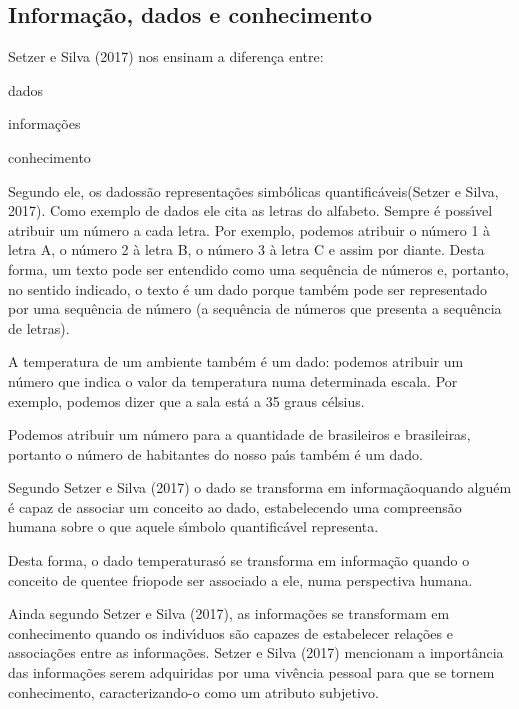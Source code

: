 \documentclass[
12pt,		%
openright,	%
twoside,  %
a4paper,			%
chapter=TITLE,		%
english,			%
french,				%
spanish,			%
brazil				%
]{USPSC-classe/USPSC}
\begin{document}
\subsection[Informa\c{c}\~ao, dados e conhecimento]{Informa\c{c}\~ao, dados e conhecimento}\label{Informa\c{c}\~ao, dados e conhecimento}
 Setzer e Silva (2017)  nos ensinam a diferen\c{c}a entre:



\begin{alineas}
\item dados
\item informa\c{c}\~oes
\item conhecimento
\end{alineas}

Segundo ele, os \textquotedbl dados\textquotedbl  s\~ao \textquotedbl representa\c{c}\~oes simb\'olicas quantific\'aveis\textquotedbl   (Setzer e Silva, 2017). Como exemplo de dados ele cita as letras do alfabeto. Sempre \'e poss\'{\i}vel atribuir um n\'umero a cada letra. Por exemplo, podemos atribuir o n\'umero 1 \`a letra A, o n\'umero 2 \`a letra B, o n\'umero 3 \`a letra C e assim por diante. Desta forma, um texto pode ser entendido como uma sequ\^encia de n\'umeros e, portanto, no sentido indicado, o texto \'e um dado porque tamb\'em pode ser representado por uma sequ\^encia de n\'umero (a sequ\^encia de n\'umeros que presenta a sequ\^encia de letras).


A temperatura de um ambiente tamb\'em \'e um dado: podemos atribuir um n\'umero que indica o valor da temperatura numa determinada escala. Por exemplo, podemos dizer que a sala \textquotedbl est\'a a 35 graus c\'elsius\textquotedbl .


Podemos atribuir um n\'umero para a quantidade de brasileiros e brasileiras, portanto o n\'umero de habitantes do nosso pa\'{\i}s tamb\'em \'e um dado.


Segundo Setzer e Silva (2017) o dado se transforma em \textquotedbl informa\c{c}\~ao\textquotedbl  quando algu\'em \'e capaz de associar um conceito ao dado, estabelecendo uma compreens\~ao humana sobre o que aquele s\'{\i}mbolo quantific\'avel representa.


Desta forma, o dado \textquotedbl temperatura\textquotedbl  s\'o se transforma em informa\c{c}\~ao quando o conceito de \textquotedbl quente\textquotedbl  e \textquotedbl frio\textquotedbl  pode ser associado a ele, numa perspectiva humana.


Ainda segundo Setzer e Silva (2017), as informa\c{c}\~oes se transformam em conhecimento quando os indiv\'{\i}duos s\~ao capazes de estabelecer rela\c{c}\~oes e associa\c{c}\~oes entre as informa\c{c}\~oes.  Setzer e Silva (2017) mencionam a import\^ancia das informa\c{c}\~oes serem adquiridas por uma viv\^encia pessoal para que se tornem conhecimento, caracterizando-o como um atributo subjetivo.
\end{document}
